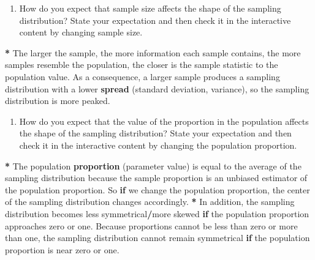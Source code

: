 \documentclass[a4paper]{book}
\newenvironment{Shaded}{\begin{snugshade}}{\end{snugshade}}
\newcommand{\KeywordTok}[1]{\textcolor[rgb]{0,0,0}{\textbf{#1}}}
\newcommand{\StringTok}[1]{\textcolor[rgb]{0.00,0.00,0.00}{#1}}
\newcommand{\ControlFlowTok}[1]{\textcolor[rgb]{0.00,0.00,0.00}{\textbf{#1}}}
\newcommand{\OperatorTok}[1]{\textcolor[rgb]{0.00,0.00,0.00}{\textbf{#1}}}
\newcommand{\NormalTok}[1]{#1}
\providecommand{\tightlist}{%
  \setlength{\itemsep}{0pt}\setlength{\parskip}{0pt}}
\theoremstyle{definition}
\theoremstyle{definition}
\theoremstyle{definition}
\theoremstyle{remark}
\begin{document}
\begin{enumerate}
\def\labelenumi{\arabic{enumi}.}
\tightlist
\item
  How do you expect that sample size affects the shape of the sampling
  distribution? State your expectation and then check it in the
  interactive content by changing sample size.
\end{enumerate}

\begin{Shaded}
\begin{Highlighting}[]
\OperatorTok{*}\StringTok{ }\NormalTok{The larger the sample, the more information each sample contains, the more}
\NormalTok{samples resemble the population, the closer is the sample statistic to the}
\NormalTok{population value. As a consequence, a larger sample produces a sampling}
\NormalTok{distribution with a lower }\KeywordTok{spread}\NormalTok{ (standard deviation, variance), so the}
\NormalTok{sampling distribution is more peaked.}
\end{Highlighting}
\end{Shaded}

\begin{enumerate}
\def\labelenumi{\arabic{enumi}.}
\setcounter{enumi}{1}
\tightlist
\item
  How do you expect that the value of the proportion in the population
  affects the shape of the sampling distribution? State your expectation
  and then check it in the interactive content by changing the
  population proportion.
\end{enumerate}

\begin{Shaded}
\begin{Highlighting}[]
\OperatorTok{*}\StringTok{ }\NormalTok{The population }\KeywordTok{proportion}\NormalTok{ (parameter value) is equal to the average of the}
\NormalTok{sampling distribution because the sample proportion is an unbiased estimator}
\NormalTok{of the population proportion. So }\ControlFlowTok{if}\NormalTok{ we change the population proportion, the}
\NormalTok{center of the sampling distribution changes accordingly.}
\OperatorTok{*}\StringTok{ }\NormalTok{In addition, the sampling distribution becomes less symmetrical}\OperatorTok{/}\NormalTok{more skewed}
\ControlFlowTok{if}\NormalTok{ the population proportion approaches zero or one. Because proportions}
\NormalTok{cannot be less than zero or more than one, the sampling distribution cannot}
\NormalTok{remain symmetrical }\ControlFlowTok{if}\NormalTok{ the population proportion is near zero or one.}
\end{Highlighting}
\end{Shaded}
\end{document}

